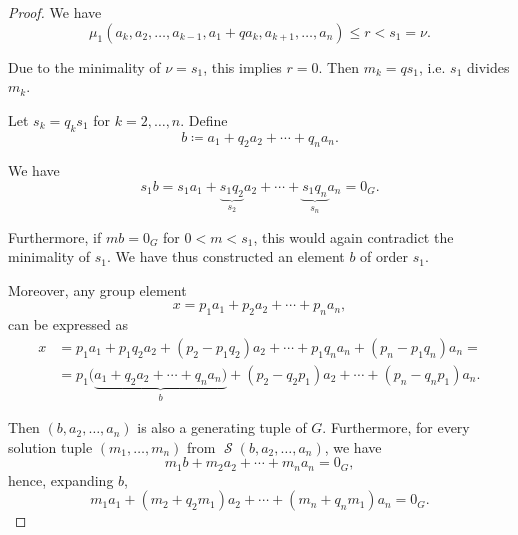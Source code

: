 \begin{proof}
  We have
  \begin{equation*}
    \mu_1(a_k, a_2, \ldots, a_{k-1}, a_1 + q a_k, a_{k+1}, \ldots, a_n) \leq r < s_1 = \nu.
  \end{equation*}

  Due to the minimality of \( \nu = s_1 \), this implies \( r = 0 \). Then \( m_k = q s_1 \), i.e. \( s_1 \) divides \( m_k \).

   Let \( s_k = q_k s_1 \) for \( k = 2, \ldots, n \). Define
  \begin{equation*}
    b \coloneqq a_1 + q_2 a_2 + \cdots + q_n a_n.
  \end{equation*}

  We have
  \begin{equation*}
    s_1 b = s_1 a_1 + \underbrace{s_1 q_2}_{s_2} a_2 + \cdots + \underbrace{s_1 q_n}_{s_n} a_n = 0_G.
  \end{equation*}

  Furthermore, if \( mb = 0_G \) for \( 0 < m < s_1 \), this would again contradict the minimality of \( s_1 \). We have thus constructed an element \( b \) of order \( s_1 \).

  Moreover, any group element
  \begin{equation*}
    x = p_1 a_1 + p_2 a_2 + \cdots + p_n a_n,
  \end{equation*}
  can be expressed as
  \begin{align*}
    x
    &=
    p_1 a_1 + p_1 q_2 a_2 + (p_2 - p_1 q_2) a_2 + \cdots + p_1 q_n a_n + (p_n - p_1 q_n) a_n
    = \\ &=
    p_1 (\underbrace{a_1 + q_2 a_2 + \cdots + q_n a_n)}_b + (p_2 - q_2 p_1) a_2 + \cdots + (p_n - q_n p_1) a_n.
  \end{align*}

  Then \( (b, a_2, \ldots, a_n) \) is also a generating tuple of \( G \). Furthermore, for every solution tuple \( (m_1, \ldots, m_n) \) from \( \mscrS(b, a_2, \ldots, a_n) \), we have
  \begin{equation}\label{eq:thm:fundamental_theorem_of_finitely_generated_abelian_groups/proof/final_sum}
    m_1 b + m_2 a_2 + \cdots + m_n a_n = 0_G,
  \end{equation}
  hence, expanding \( b \),
  \begin{equation}\label{eq:thm:fundamental_theorem_of_finitely_generated_abelian_groups/proof/final_sum_decomposition}
    m_1 a_1 + (m_2 + q_2 m_1) a_2 + \cdots + (m_n + q_n m_1) a_n = 0_G.
  \end{equation}


\end{proof}
